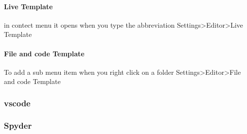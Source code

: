             \paragraph{Live Template}
                in contect menu it opens when you type the abbreviation
                Settings>Editor>Live Template
            \paragraph{File and code Template}
                To add a sub menu item when you right click on a folder
                Settings>Editor>File and code Template
        \subsubsection{vscode}
        \subsubsection{Spyder}